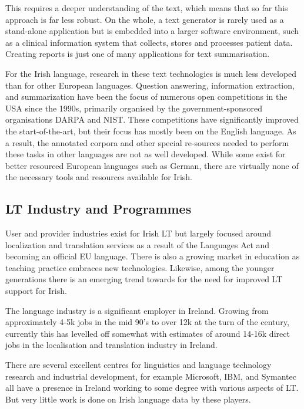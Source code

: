\documentclass[]{../../metanetpaper}
\begin{document}
\begin{multicols}{2}
This requires a deeper understanding of the text, which means that so far this approach is far less robust. On the whole, a text generator is rarely used as a stand-alone application but is embedded into a larger software environment, such as a clinical information system that collects, stores and processes patient data. Creating reports is just one of many applications for text summarisation. 

For the Irish language, research in these text technologies is much less developed than for other European languages. Question answering, information extraction, and summarization have been the focus of numerous open competitions in the USA since the 1990s, primarily organised by the government-sponsored organisations DARPA and NIST. These competitions have significantly improved the start-of-the-art, but their focus has mostly been on the English language. As a result, the annotated corpora and other special re-sources needed to perform these tasks in other languages are not as well developed. While some exist for better resourced European languages such as German, there are virtually none of the necessary tools and resources available for Irish.

\subsection{LT Industry and Programmes}

User and provider industries exist for Irish LT but largely focused around localization and translation services as a result of the Languages Act and becoming an official EU language. There is also a growing market in education as teaching practice embraces new technologies. Likewise, among the younger generations there is an emerging trend towards for the need for improved LT support for Irish.

The language industry is a significant employer in Ireland. Growing from approximately 4-5k jobs in the mid 90’s to over 12k at the turn of the century, currently this has levelled off somewhat with estimates of around 14-16k direct jobs in the localisation and translation industry in Ireland.

There are several excellent centres for linguistics and language technology research and industrial development, for example Microsoft, IBM, and Symantec all have a presence in Ireland working to some degree with various aspects of LT. But very little work is done on Irish language data by these players.


\end{multicols}
\end{document}
